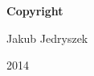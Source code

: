 
\newpage

\thispagestyle{empty}

\vspace*{1.5cm}

\begin{center}

{\bf \Huge Copyright}

\vspace{1cm}


   \Large Jakub Jedryszek\\

   \vspace{0.5cm}


   2014\\

   \vspace{0.5cm}

\end{center}
